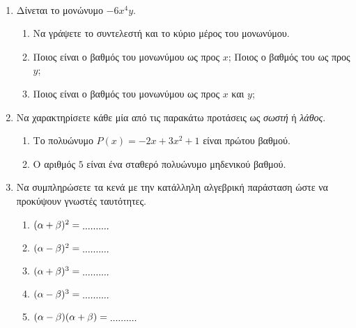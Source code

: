 \documentclass[12pt,a4page]{article}
\def\defaultDots{10}
\begin{document}
\authoritylogo
\hfill%
\examdetails[2pt]{20.5em}

\vspace{2ex}


\vspace*{1.5ex}

\setlength \baselineskip{14.5pt}

\theorypart
\begin{schltask}[label=\normalsize\bf\letterspace{\defaultletterspace}ΘΕΩΡΙΑ\ \arabic*,itemsep=2ex,leftmargin=-5pt]
\item \leavevmode\\[-1.5\baselineskip]%
  \begin{enumerate}[label=\bf\Alph*.,itemsep=4ex]
  \item Δίνεται το μονώνυμο $-6 x^4 y $.
    \begin{enumerate}[label=\bf\arabic*\hspace{1pt}),itemsep=2ex]
    \item Να γράψετε το συντελεστή και  το κύριο μέρος του μονωνύμου.
    \item Ποιος είναι ο βαθμός του μονωνύμου ως προς $x$;  Ποιος ο βαθμός του ως προς $y$;
    \item Ποιος είναι ο βαθμός του μονωνύμου ως προς $x$ και $y$;
    \end{enumerate}

  \item Να χαρακτηρίσετε κάθε μία από τις παρακάτω προτάσεις ως \textit{σωστή} ή \textit{λάθος}.
    \begin{enumerate}[label=\bf\arabic*\hspace{1pt}),itemsep=2ex]
    \item Το πολυώνυμο $P(x) = -2x + 3 x^2 + 1$ είναι πρώτου βαθμού.
    \item Ο αριθμός $5$ είναι ένα σταθερό πολυώνυμο μηδενικού βαθμού.
    \end{enumerate}

  \item  Να συμπληρώσετε τα κενά με την κατάλληλη αλγεβρική παράσταση ώστε να προκύψουν γνωστές ταυτότητες.
    \begin{enumerate}[label=\bf\arabic*\hspace{1pt}),itemsep=2ex]
    \item $( \alpha + \beta )^2 = \lowerdots{\defaultDots}$
    \item $( \alpha - \beta )^2 = \lowerdots{\defaultDots}$
    \item $( \alpha + \beta )^3 = \lowerdots{\defaultDots}$
    \item $( \alpha - \beta )^3 = \lowerdots{\defaultDots}$
    \item $( \alpha - \beta )( \alpha + \beta ) = \lowerdots{\defaultDots}$
    \end{enumerate}
  \end{enumerate}


\end{schltask}
\end{document}
